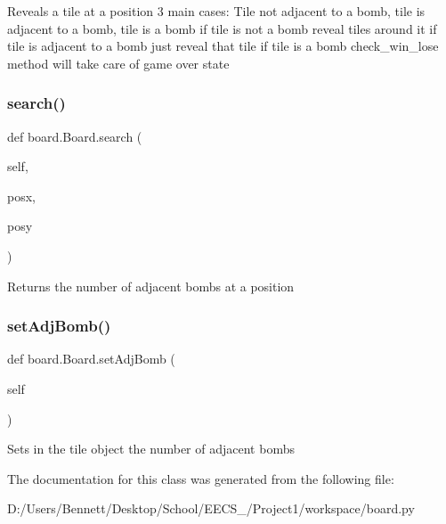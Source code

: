 \begin{DoxyVerb}Reveals a tile at a position
    3 main cases: Tile not adjacent to a bomb, tile is adjacent to a bomb, tile is a bomb
    if tile is not a bomb reveal tiles around it
    if tile is adjacent to a bomb just reveal that tile
    if tile is a bomb check_win_lose method will take care of game over state\end{DoxyVerb}
 \mbox{\label{classboard_1_1_board_a420310ce5c8eb10a889a3e583783b9e9}} 
\subsubsection{\texorpdfstring{search()}{search()}}
{\footnotesize\ttfamily def board.\+Board.\+search (\begin{DoxyParamCaption}\item[{}]{self,  }\item[{}]{posx,  }\item[{}]{posy }\end{DoxyParamCaption})}

\begin{DoxyVerb}Returns the number of adjacent bombs at a position\end{DoxyVerb}
 \mbox{\label{classboard_1_1_board_a2a2634ef64e8ae39381583c459c5026d}} 
\subsubsection{\texorpdfstring{set\+Adj\+Bomb()}{setAdjBomb()}}
{\footnotesize\ttfamily def board.\+Board.\+set\+Adj\+Bomb (\begin{DoxyParamCaption}\item[{}]{self }\end{DoxyParamCaption})}

\begin{DoxyVerb}Sets in the tile object the number of adjacent bombs\end{DoxyVerb}
 

The documentation for this class was generated from the following file\+:\begin{DoxyCompactItemize}
\item 
D\+:/\+Users/\+Bennett/\+Desktop/\+School/\+E\+E\+C\+S\+\_/\+Project1/workspace/board.\+py\end{DoxyCompactItemize}
